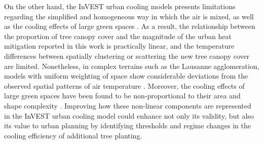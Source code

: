 \documentclass[10pt,letterpaper]{article}
\begin{document}
On the other hand, the InVEST urban cooling models presents limitations regarding the simplified and homogeneous way in which the air is mixed, as well as the cooling effects of large green spaces \cite{sharp2020invest,bosch2020spatially}.
As a result, the relationship between the proportion of tree canopy cover and the magnitude of the urban heat mitigation reported in this work is practically linear, and the temperature differences between spatially clustering or scattering the new tree canopy cover are limited.
Nonetheless, in complex terrains such as the Lausanne agglomeration, models with uniform weighting of space show considerable deviations from the observed spatial patterns of air temperature \cite{frei2014interpolation}. Moreover, the cooling effects of large green spaces have been found to be non-proportional to their area and shape complexity \cite{chen2014effect,bao2016assessing,du2017quantifying}.
Improving how these non-linear components are represented in the InVEST urban cooling model could enhance not only its validity, but also its value to urban planning by identifying thresholds and regime changes in the cooling efficiency of additional tree planting.
\end{document}
